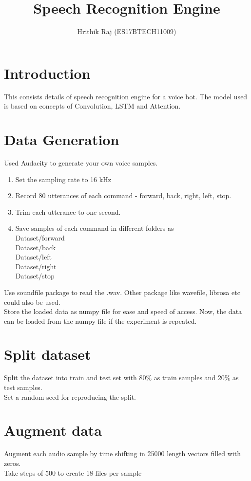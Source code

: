 \documentclass[11pt,english]{article}
\begin{document}
\title{Speech Recognition Engine}
\author{Hrithik Raj (ES17BTECH11009)}

\sloppy
\maketitle
\setlength{\columnsep}{0.25in}
\twocolumn
\tableofcontents

\section{Introduction}
This consists details of speech recognition engine for a voice bot. 
The model used is based on concepts of Convolution, LSTM and Attention.

\section{Data Generation}
Used Audacity to generate your own voice samples.
\begin{enumerate}
    \item Set the sampling rate to 16 kHz
    \item Record 80 utterances of each command - forward, back, right, left, stop.
    \item Trim each utterance to one second.
    \item Save samples of each command in different folders as\\
        Dataset/forward\\
        Dataset/back\\
        Dataset/left\\
        Dataset/right\\
        Dataset/stop
\end{enumerate}
Use soundfile package to read the .wav. Other package like wavefile, librosa etc could also be used.\\
Store the loaded data as numpy file for ease and speed of access. Now, the data can be loaded from the numpy file if the experiment is repeated.

\section{Split dataset}
Split the dataset into train and test set with 80\% as train samples and 20\% as test samples.\\
Set a random seed for reproducing the split.

\section{Augment data}
Augment each audio sample by time shifting in 25000 length vectors filled with zeros. \\
Take steps of 500 to create 18 files per sample
\end{document}
